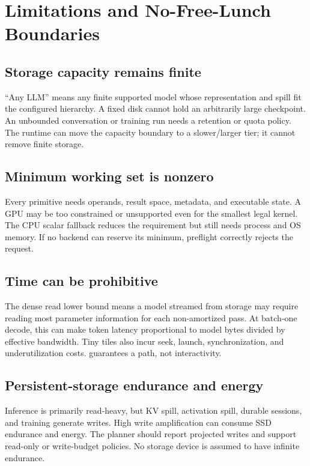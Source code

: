 \section{Limitations and No-Free-Lunch Boundaries}
\label{sec:limitations}

\subsection{Storage capacity remains finite}

``Any LLM'' means any finite supported model whose representation and spill fit the configured hierarchy. A fixed disk cannot hold an arbitrarily large checkpoint. An unbounded conversation or training run needs a retention or quota policy. The runtime can move the capacity boundary to a slower/larger tier; it cannot remove finite storage.

\subsection{Minimum working set is nonzero}

Every primitive needs operands, result space, metadata, and executable state. A GPU may be too constrained or unsupported even for the smallest legal kernel. The CPU scalar fallback reduces the requirement but still needs process and OS memory. If no backend can reserve its minimum, preflight correctly rejects the request.

\subsection{Time can be prohibitive}

The dense read lower bound means a model streamed from storage may require reading most parameter information for each non-amortized pass. At batch-one decode, this can make token latency proportional to model bytes divided by effective bandwidth. Tiny tiles also incur seek, launch, synchronization, and underutilization costs. \AMS guarantees a path, not interactivity.

\subsection{Persistent-storage endurance and energy}

Inference is primarily read-heavy, but KV spill, activation spill, durable sessions, and training generate writes. High write amplification can consume SSD endurance and energy. The planner should report projected writes and support read-only or write-budget policies. No storage device is assumed to have infinite endurance.

